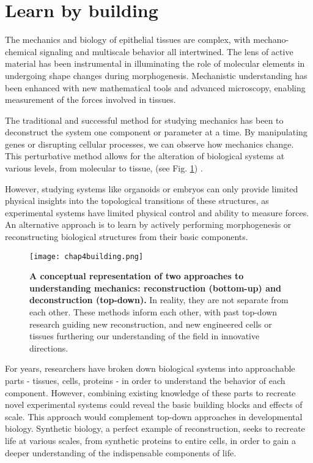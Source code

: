
\hypertarget{learn-by-building}{%
	\section{Learn by building}\label{learn-by-building}}

The mechanics and biology of epithelial tissues are complex, with mechano-chemical signaling and multiscale behavior all intertwined. The lens of active material has been instrumental in illuminating the role of molecular elements in undergoing shape changes during morphogenesis. Mechanistic understanding has been enhanced with new mathematical tools and advanced microscopy, enabling measurement of the forces involved in tissues.

The traditional and successful method for studying mechanics has been to deconstruct the system one component or parameter at a time. By manipulating genes or disrupting cellular processes, we can observe how mechanics change. This perturbative method allows for the alteration of biological systems at various levels, from molecular to tissue, (see Fig. \ref{fig_4_1}) .

However, studying systems like organoids or embryos can only provide limited physical insights into the topological transitions of these structures, as experimental systems have limited physical control and ability to measure forces. An alternative approach is to learn by actively performing morphogenesis or reconstructing biological structures from their basic components.

\begin{figure}
	\centering
	\texttt{[image: chap4building.png]}
	\caption{\label{fig_4_1} \textbf{A conceptual representation of two approaches to understanding mechanics: reconstruction (bottom-up) and deconstruction (top-down).} In reality, they are not separate from each other. These methods inform each other, with past top-down research guiding new reconstruction, and new engineered cells or tissues furthering our understanding of the field in innovative directions.
}
\end{figure}

For years, researchers have broken down biological systems into approachable parts - tissues, cells, proteins - in order to understand the behavior of each component. However, combining existing knowledge of these parts to recreate novel experimental systems could reveal the basic building blocks and effects of scale. This approach would complement top-down approaches in developmental biology. Synthetic biology, a perfect example of reconstruction, seeks to recreate life at various scales, from synthetic proteins to entire cells, in order to gain a deeper understanding of the indispensable components of life.

